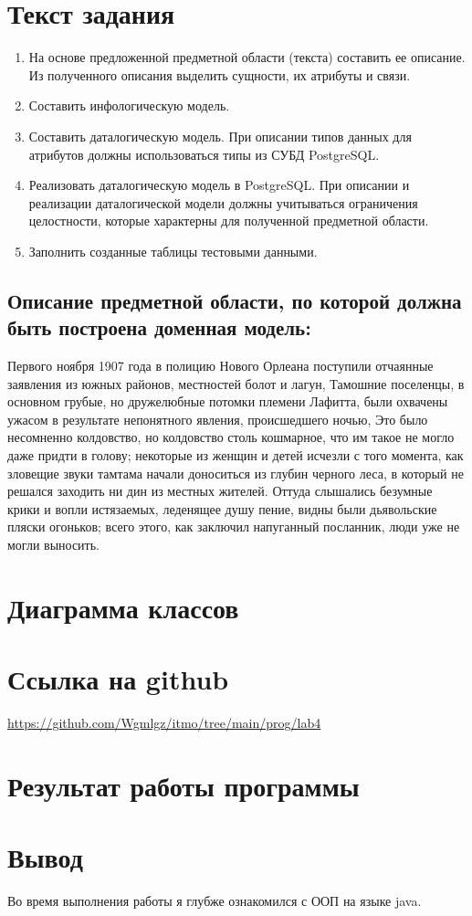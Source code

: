 \documentclass{article}
\begin{document}
\itmo[
  variant=371364,
  labn=1,
  discipline=Информационные системы и базы данных,
  group=P3115,
  student=Владимир Мацюк,
  teacher=Горбунов Михаил Витальевич,
  year=2023
]

\section{Текст задания}
\begin{enumerate}
  \item На основе предложенной предметной области (текста) составить ее описание. Из полученного описания выделить сущности, их атрибуты и связи.
  \item Составить инфологическую модель.
  \item Составить даталогическую модель. При описании типов данных для атрибутов должны использоваться типы из СУБД PostgreSQL.
  \item Реализовать даталогическую модель в PostgreSQL. При описании и реализации даталогической модели должны учитываться ограничения целостности, которые характерны для полученной предметной области.
  \item Заполнить созданные таблицы тестовыми данными.
\end{enumerate}
\subsection{Описание предметной области, по которой должна быть построена доменная модель:}

Первого ноября 1907 года в полицию Нового Орлеана поступили отчаянные заявления из южных районов, местностей болот и лагун, Тамошние поселенцы, в основном грубые, но дружелюбные потомки племени Лафитта, были охвачены ужасом в результате непонятного явления, происшедшего ночью, Это было несомненно колдовство, но колдовство столь кошмарное, что им такое не могло даже придти в голову; некоторые из женщин и детей исчезли с того момента, как зловещие звуки тамтама начали доноситься из глубин черного леса, в который не решался заходить ни дин из местных жителей. Оттуда слышались безумные крики и вопли истязаемых, леденящее душу пение, видны были дьявольские пляски огоньков; всего этого, как заключил напуганный посланник, люди уже не могли выносить.

\section{Диаграмма классов}

\begin{center}
\end{center}

\section{Ссылка на github}
\url{https://github.com/Wgmlgz/itmo/tree/main/prog/lab4}
\section{Результат работы программы}
\section{Вывод}
Во время выполнения работы я глубже ознакомился с ООП на языке java.
\end{document}
